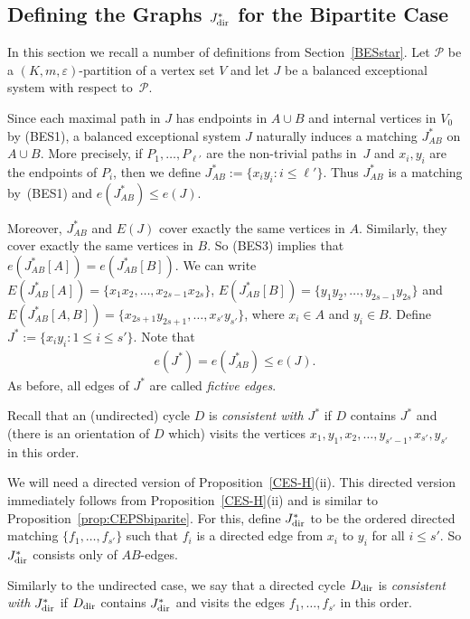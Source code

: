 \documentclass{memo-l}
\def\COMMENT#1{}
\def\eps{\varepsilon}
\numberwithin{section}{chapter}
\numberwithin{equation}{section}
\numberwithin{firstthm}{section}
\numberwithin{figure}{section}
\begin{document}
{\subsection{Defining the Graphs $J^*_{\rm dir}$ for the Bipartite Case} \label{sec:J*2bip}
In this section we recall a number of definitions from Section~\ref{BESstar}.
Let $\mathcal{P}$ be a $(K,m,\eps)$-partition of a vertex set $V$ and
let $J$ be a balanced exceptional system with respect to~$\mathcal{P}$.
%
	   \COMMENT{Allan: I have rephrased the definition/construction of $J^*$. $J^*$ is still the same as before.
The construction is similar to the two cliques case.  So check whether things
are ok now. Note we no longer have conditions (BES$'$1), (BES$'$2), (BES$^*$1),(BES$^*$2) but they don't appear anywhere here (and only once in paper 2).}
Since each maximal path in $J$ has endpoints in $A \cup B$ and internal vertices in $V_0$ by (BES1), a balanced exceptional system $J$ naturally induces a matching $J^*_{AB}$ on $A \cup B$.
More precisely, if $P_1, \dots ,P_{\ell'}$ are the non-trivial paths in~$J$ and $x_i, y_i$ are the endpoints of $P_i$, then we define $J^*_{AB} := \{x_iy_i : i  \le \ell'\}$. 
Thus $J^*_{AB}$ is a matching by~(BES1) and $e(J^*_{AB}) \le e(J)$.%
    \COMMENT{Daniela: deleted  by~(BES4)}
Moreover, $J^*_{AB}$ and $E(J)$ cover exactly the same vertices in $A$. 
Similarly, they cover exactly the same vertices in $B$. 
So (BES3) implies that $e(J^*_{AB}[A])=e(J^*_{AB}[B])$.
We can write $E(J^*_{AB}[A])=\{x_1x_2, \dots, x_{2s-1}x_{2s}\}$,
$E(J^*_{AB}[B])=\{y_1y_2, \dots, y_{2s-1}y_{2s}\}$ and $E(J^*_{AB}[A,B])=\{x_{2s+1}y_{2s+1}, \dots, x_{s'}y_{s'}\}$, where $x_i \in A$ and $y_i \in B$.
Define $J^*:= \{ x_iy_i : 1 \le i \le s' \}$.
Note that 
\begin{align}
	e(J^*) =  e(J^*_{AB}) \le e(J). \label{BESeq}
\end{align}
As before, all edges of $J^*$ are called \emph{fictive edges}.%
   \COMMENT{Daniela: deleted "Similarly as in the two cliques case, we regard $J^*$ as being edge-disjoint from the original graph~$G$."}
Recall that an (undirected) cycle $D$ is \emph{consistent with $J^*$} if $D$ contains $J^*$ and (there is an orientation of $D$ which)
visits the vertices $x_1,y_1,x_2,\dots,y_{s'-1},x_{s'},y_{s'}$ in this order.



We will  need a directed version of Proposition~\ref{CES-H}(ii). This directed version immediately follows from  Proposition~\ref{CES-H}(ii)
and is similar to Proposition~\ref{prop:CEPSbiparite}.
For this, define $J^*_{\rm dir}$ to be the ordered directed matching $\{f_1, \dots, f_{s'}\}$ such that $f_i$ is a
directed edge from $x_i$ to $y_i$ for all $i \le s'$. So $J^*_{\rm dir}$ consists only of $AB$-edges.%
    \COMMENT{Deryk: added new sentence}
Similarly to the undirected case, we say that a directed cycle
$D_{\rm dir}$ is \emph{consistent with $J^*_{\rm dir}$}
if $D_{\rm dir}$ contains $J^*_{\rm dir}$ and visits the edges $f_1,\dots,f_{s'}$ in this order.

}
\end{document}
